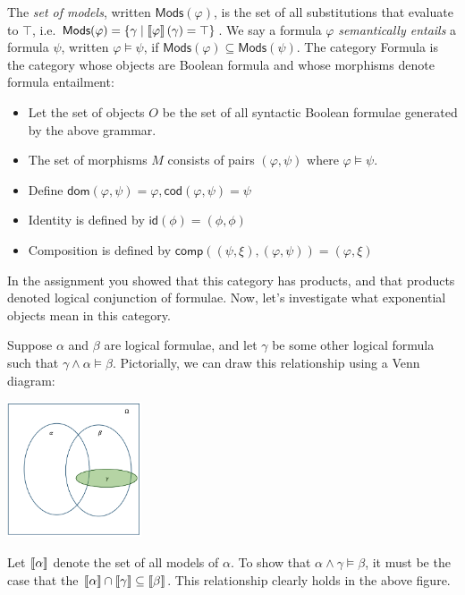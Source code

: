 The \emph{set of models}, written $\mathsf{Mods}(\varphi)$, is the set of all substitutions 
that evaluate to $\top$, i.e. $\mathsf{Mods}(\varphi) = \{\gamma \mid \left\llbracket \varphi \right\rrbracket(\gamma) = \top\}$.
We say a formula $\varphi$ \emph{semantically entails} a formula $\psi$, written $\varphi \models \psi$,
if $\mathsf{Mods}(\varphi) \subseteq \mathsf{Mods}(\psi)$.
The category \textsf{Formula} is 
the category whose objects are Boolean formula and whose morphisms denote formula entailment:
  \begin{itemize}
    \item Let the set of objects $O$ be the set of all syntactic Boolean
    formulae generated by the above grammar.
    \item The set of morphisms $M$ consists of pairs $(\varphi, \psi)$ where
    $\varphi \models \psi$.
    \item Define $\mathsf{dom}(\varphi, \psi) = \varphi, \mathsf{cod}(\varphi, \psi) = \psi$
    \item Identity is defined by $\mathsf{id}(\phi) = (\phi, \phi)$
    \item Composition is defined by $\mathsf{comp}((\psi, \xi), (\varphi, \psi)) = (\varphi, \xi)$
  \end{itemize}

In the assignment
you showed that this category has products, and that products denoted
logical conjunction of formulae. Now, let's investigate what exponential objects
mean in this category.

Suppose $\alpha$ and $\beta$ are logical formulae, and let $\gamma$ be 
some other logical formula
such that $\gamma \land \alpha \models \beta$. 
Pictorially, we can draw this 
relationship using a Venn diagram:

\begin{center}
  \includegraphics[width=150px]{fig/venn-1.png}
\end{center}

Let $\left\llbracket \alpha \right\rrbracket$ denote the set of all models of $\alpha$. To show that
$\alpha \land \gamma \models \beta$, it must be the case that the
$\left\llbracket \alpha \right\rrbracket \cap \left\llbracket \gamma \right\rrbracket \subseteq \left\llbracket \beta \right\rrbracket$. This
relationship clearly holds in the above figure.

